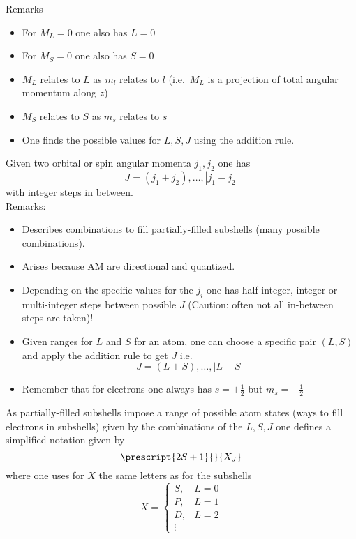 Remarks
\begin{itemize}
    \item For $M_L=0$ one also has $L=0$
    \item For $M_S=0$ one also has $S=0$
    \item $M_L$ relates to $L$ as $m_l$ relates to $l$ (i.e.\ $M_L$ is a projection of total angular momentum along $z$)
    \item $M_S$ relates to $S$ as $m_s$ relates to $s$
    \item One finds the possible values for $L,S,J$ using the addition rule.
\end{itemize}


Given two orbital or spin angular momenta $j_1, j_2$ one has
\begin{equation*}
    J=(j_1+j_2),\dots,|j_1-j_2|
\end{equation*}
with integer steps in between.\\
Remarks:
\begin{itemize}
    \item Describes combinations to fill partially-filled subshells (many possible combinations).
    \item Arises because AM are directional and quantized.
    \item Depending on the specific values for the $j_i$ one has half-integer, integer or multi-integer steps between possible $J$ (Caution: often not all in-between steps are taken)!
    \item Given ranges for $L$ and $S$ for an atom, one can choose a specific pair $(L,S)$ and apply the addition rule to get $J$ i.e.
          \begin{equation*}
              J=(L+S),\dots,|L-S|
          \end{equation*}
    \item Remember that for electrons one always has $s=+\frac{1}{2}$ but $m_s=\pm \frac{1}{2}$
\end{itemize}


As partially-filled subshells impose a range of possible atom states (ways to fill electrons in subshells) given by the combinations of the $L,S,J$ one defines a simplified notation given by
\begin{equation*}
    \prescript{2S+1}{}{X_J}
\end{equation*}
where one uses for $X$ the same letters as for the subshells
\begin{equation*}
    X=
    \begin{cases}
        S,     & L=0 \\
        P,     & L=1 \\
        D,     & L=2 \\
        \vdots &
    \end{cases}
\end{equation*}

